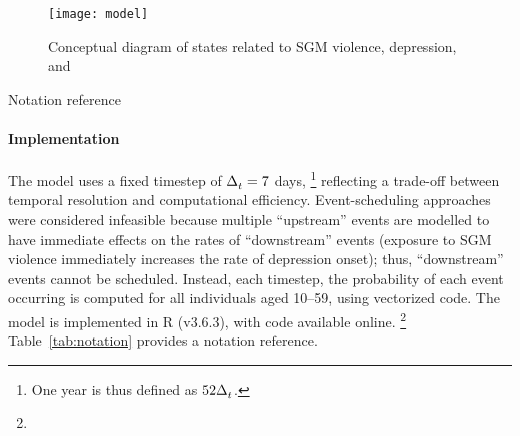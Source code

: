 \begin{figure}
  \centering\texttt{[image: model]}
  \caption{Conceptual diagram of states related to
    SGM violence, depression, and \hazdrink}
  \label{fig:model}
\end{figure}
\begin{table}
  \caption{Notation reference}
  \label{tab:notation}
  \centering
\end{table}
\paragraph{Implementation}
The model uses a fixed timestep of $\Delta_t^{} = 7$ days,%
\footnote{One year is thus defined as $52\Delta_t^{}$.}
reflecting a trade-off between temporal resolution and computational efficiency.
Event-scheduling approaches were considered infeasible because
multiple ``upstream'' events are modelled to have
immediate effects on the rates of ``downstream'' events
(\eg exposure to SGM violence
immediately increases the rate of depression onset);
thus, ``downstream'' events cannot be scheduled.
Instead, each timestep, the probability of each event occurring
is computed for all individuals aged 10--59, using vectorized code.
The model is implemented in R (v3.6.3), with code available online.%
\footnote{}
Table~\ref{tab:notation} provides a notation reference.
